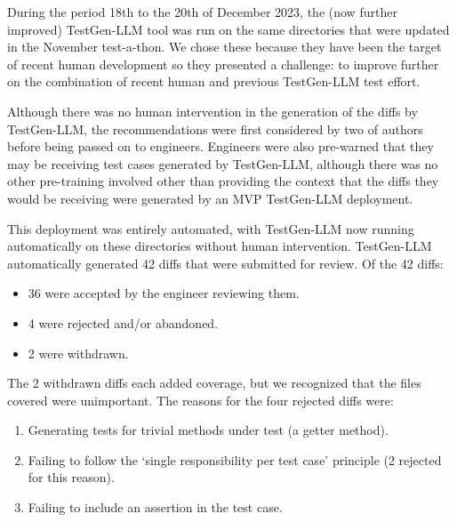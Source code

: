 \documentclass[sigconf,screen]{acmart}
\begin{document}
During the period 18th to the 20th of December 2023, the (now further improved) TestGen-LLM tool was run on the same directories that were updated in the November test-a-thon. 
We chose these because they have been the target of recent human development so they 
presented a challenge: to improve further on the combination of recent human and previous TestGen-LLM test effort.

Although there was no human intervention in the generation of the diffs by TestGen-LLM, the recommendations were first considered by two of authors before being passed on to engineers.
Engineers were also pre-warned that they may be receiving test cases generated by TestGen-LLM, although there was no other pre-training involved other than providing the context that the diffs they would be receiving were generated by an MVP TestGen-LLM deployment.

This deployment was entirely automated, with TestGen-LLM now running  automatically on these directories without human intervention.
TestGen-LLM automatically generated 42 diffs that were submitted for review. 
Of the 42 diffs:

\begin{itemize}
\item 36 were accepted by the engineer reviewing them.
\item 4 were rejected and/or abandoned.
\item 2 were withdrawn.
\end{itemize}


The 2 withdrawn diffs each added coverage, but we recognized that the files covered were unimportant. 
The reasons for the four rejected diffs were:

\begin{enumerate}
\item Generating tests for trivial methods under test (a getter method).
\item Failing to follow the `single responsibility per test case' principle (2 rejected for this reason).
\item Failing to include an assertion in the test case.
\end{enumerate}
\end{document}
